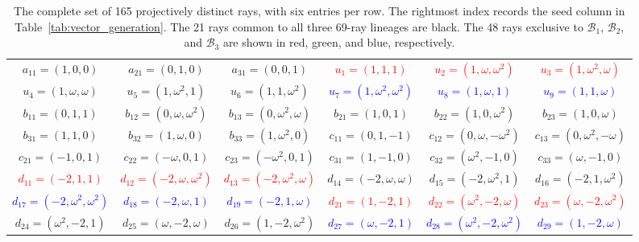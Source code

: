 \documentclass[%
  reprint,
  superscriptaddress,
  showpacs,
  showkeys,
  amsmath,amssymb,
  pra,
  longbibliography,
  floatfix,
  x11names
]{revtex4-2}
\newcommand{\rev}[1]{{\color{revisionblue}#1}}
\begin{document}
\begin{table}[htbp!]
\caption{
\rev{The complete set of 165 projectively distinct rays, with six entries per row.  The rightmost index records the seed column in Table~\ref{tab:vector_generation}.  The 21 rays common to all three 69-ray lineages are black.  The 48 rays exclusive to $\mathcal{B}_1$, $\mathcal{B}_2$, and $\mathcal{B}_3$ are shown in red, green, and blue, respectively.}
}
\label{tab:noncollinear_vectors_6col}
\footnotesize %
\begin{ruledtabular}
\begin{tabular}{*{6}{c}} %
{$a_{11}=(1,0,0)$} & {$a_{21}=(0,1,0)$} & {$a_{31}=(0,0,1)$} & \textcolor{red}{$u_{1}=(1,1,1)$} & \textcolor{red}{$u_{2}=(1,\omega,\omega^2)$} & \textcolor{red}{$u_{3}=(1,\omega^2,\omega)$} \\
\textcolor{green!40!black}{$u_{4}=(1,\omega,\omega)$} & \textcolor{green!40!black}{$u_{5}=(1,\omega^2,1)$} & \textcolor{green!40!black}{$u_{6}=(1,1,\omega^2)$} & \textcolor{blue}{$u_{7}=(1,\omega^2,\omega^2)$} & \textcolor{blue}{$u_{8}=(1,\omega,1)$} & \textcolor{blue}{$u_{9}=(1,1,\omega)$} \\
{$b_{11}=(0,1,1)$} & {$b_{12}=(0,\omega,\omega^2)$} & {$b_{13}=(0,\omega^2,\omega)$} & {$b_{21}=(1,0,1)$} & {$b_{22}=(1,0,\omega^2)$} & {$b_{23}=(1,0,\omega)$} \\
{$b_{31}=(1,1,0)$} & {$b_{32}=(1,\omega,0)$} & {$b_{33}=(1,\omega^2,0)$} & {$c_{11}=(0,1,-1)$} & {$c_{12}=(0,\omega,-\omega^2)$} & {$c_{13}=(0,\omega^2,-\omega)$} \\
{$c_{21}=(-1,0,1)$} & {$c_{22}=(-\omega,0,1)$} & {$c_{23}=(-\omega^2,0,1)$} & {$c_{31}=(1,-1,0)$} & {$c_{32}=(\omega^2,-1,0)$} & {$c_{33}=(\omega,-1,0)$} \\
\textcolor{red}{$d_{11}=(-2,1,1)$} & \textcolor{red}{$d_{12}=(-2,\omega,\omega^2)$} & \textcolor{red}{$d_{13}=(-2,\omega^2,\omega)$} & \textcolor{green!40!black}{$d_{14}=(-2,\omega,\omega)$} & \textcolor{green!40!black}{$d_{15}=(-2,\omega^2,1)$} & \textcolor{green!40!black}{$d_{16}=(-2,1,\omega^2)$} \\
\textcolor{blue}{$d_{17}=(-2,\omega^2,\omega^2)$} & \textcolor{blue}{$d_{18}=(-2,\omega,1)$} & \textcolor{blue}{$d_{19}=(-2,1,\omega)$} & \textcolor{red}{$d_{21}=(1,-2,1)$} & \textcolor{red}{$d_{22}=(\omega^2,-2,\omega)$} & \textcolor{red}{$d_{23}=(\omega,-2,\omega^2)$} \\
\textcolor{green!40!black}{$d_{24}=(\omega^2,-2,1)$} & \textcolor{green!40!black}{$d_{25}=(\omega,-2,\omega)$} & \textcolor{green!40!black}{$d_{26}=(1,-2,\omega^2)$} & \textcolor{blue}{$d_{27}=(\omega,-2,1)$} & \textcolor{blue}{$d_{28}=(\omega^2,-2,\omega^2)$} & \textcolor{blue}{$d_{29}=(1,-2,\omega)$} \\

\end{tabular}
\end{ruledtabular}
\end{table}
\end{document}

